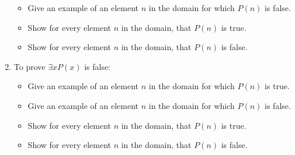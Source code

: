 \documentclass[11pt,]{book}
\theoremstyle{ptxplainnotitle}
\theoremstyle{ptxplaintitle}
\theoremstyle{ptxdefinitionnotitle}
\theoremstyle{ptxdefinitiontitle}
\theoremstyle{ptxdefinitionnotitle}
\theoremstyle{ptxdefinitiontitle}
\theoremstyle{ptxdefinitionnotitle}
\theoremstyle{ptxdefinitiontitle}
\theoremstyle{ptxdefinitiontitlenonumber}
\theoremstyle{ptxdefinitiontitlenonumber}
\numberwithin{equation}{chapter}
\begin{document}
\begin{divisionexercise}{9}
\begin{enumerate}[label=\alph*.]
\begin{itemize}[label=$\odot$,leftmargin=3em,]
\item{}\hypertarget{p-2103}{}%
Give an example of an element \(n\) in the domain for which \(P(n)\) is false.%

\item{}\hypertarget{p-2104}{}%
Show for every element \(n\) in the domain, that \(P(n)\) is true.%

\item{}\hypertarget{p-2105}{}%
Show for every element \(n\) in the domain, that \(P(n)\) is false.%

\end{itemize}
%
\item\hypertarget{li-1047}{}\hypertarget{p-2106}{}%
To prove \(\exists x P(x)\) is false:%
\par
\hypertarget{p-2107}{}%
\par
\begin{itemize}[label=$\odot$,leftmargin=3em,]
\item{}\hypertarget{p-2108}{}%
Give an example of an element \(n\) in the domain for which \(P(n)\) is true.%

\item{}\hypertarget{p-2109}{}%
Give an example of an element \(n\) in the domain for which \(P(n)\) is false.%

\item{}\hypertarget{p-2110}{}%
Show for every element \(n\) in the domain, that \(P(n)\) is true.%

\item{}\hypertarget{p-2111}{}%
Show for every element \(n\) in the domain, that \(P(n)\) is false.%

\end{itemize}
%
\end{enumerate}
%
\end{divisionexercise}%
\end{document}

